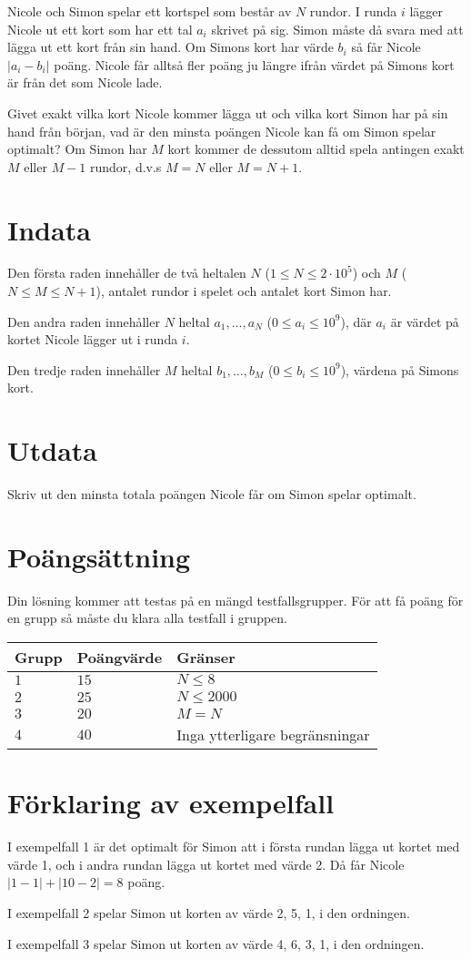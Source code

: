 Nicole och Simon spelar ett kortspel som består av $N$ rundor.
I runda $i$ lägger Nicole ut ett kort som har ett tal $a_i$ skrivet på sig.
Simon måste då svara med att lägga ut ett kort från sin hand.
Om Simons kort har värde $b_i$ så får Nicole $|a_i-b_i|$ poäng.
Nicole får alltså fler poäng ju längre ifrån värdet på Simons kort är från det som Nicole lade.

Givet exakt vilka kort Nicole kommer lägga ut och vilka kort Simon har på sin hand från början, vad är den minsta poängen Nicole kan få om Simon spelar optimalt?
Om Simon har $M$ kort kommer de dessutom alltid spela antingen exakt $M$ eller $M - 1$ rundor, d.v.s $M = N$ eller $M = N + 1$.

\section*{Indata}
Den första raden innehåller de två heltalen $N$ ($1\leq N \leq 2 \cdot 10^5$) och $M$ ($N\leq M \leq N+1$), antalet rundor i spelet och antalet kort Simon har.

Den andra raden innehåller $N$ heltal $a_1, \dots, a_N$ ($0\le a_i \le 10^9$), där $a_i$ är värdet på kortet Nicole lägger ut i runda $i$.

Den tredje raden innehåller $M$ heltal $b_1, \dots, b_M$ ($0\le b_i \le 10^9$), värdena på Simons kort.

\section*{Utdata}
Skriv ut den minsta totala poängen Nicole får om Simon spelar optimalt.

\section*{Poängsättning}
Din lösning kommer att testas på en mängd testfallsgrupper.
För att få poäng för en grupp så måste du klara alla testfall i gruppen.

\noindent
\begin{tabular}{| l | l | p{12cm} |}
  \hline
  Grupp & Poängvärde & Gränser \\ \hline
  $1$   & $15$       & $N \leq 8 $\\ \hline
  $2$   & $25$       & $N \leq 2000 $  \\ \hline
  $3$   & $20$       & $M=N$ \\ \hline
  $4$   & $40$       & Inga ytterligare begränsningar \\ \hline
\end{tabular}

\section*{Förklaring av exempelfall}
I exempelfall 1 är det optimalt för Simon att i första rundan lägga ut kortet med värde 1, och i andra rundan lägga ut kortet med värde 2. Då får Nicole $|1-1| + |10-2|=8$ poäng.

I exempelfall 2 spelar Simon ut korten av värde 2, 5, 1, i den ordningen.

I exempelfall 3 spelar Simon ut korten av värde 4, 6, 3, 1, i den ordningen.
